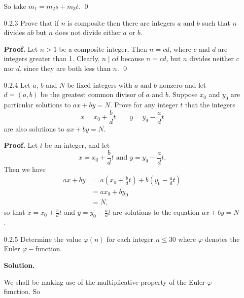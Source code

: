 \begin{enumerate}
      So take $m_1 = m_2s + m_3t$. \qed
   \item[0.2.3]   Prove that if $n$ is composite then there are integers $a$ and
                  $b$ such that $n$ divides $ab$ but $n$ does not divide either
                  $a$ or $b$.

      \textbf{Proof.} Let $n > 1$ be a composite integer. Then $n = cd$, where
      $c$ and $d$ are integers greater than 1. Clearly, $n \mid cd$ because
      $n = cd$, but $n$ divides neither $c$ nor $d$, since they are both less
      than $n$. \qed
   \item[0.2.4]   Let $a$, $b$ and $N$ be fixed integers with $a$ and $b$ 
                  nonzero and let $d = (a, b)$ be the greatest common divisor of
                  $a$ and $b$. Suppose $x_0$ and $y_0$ are particular solutions
                  to $ax + by = N$. Prove for any integer $t$ that the integers
                  $$x = x_0 + \frac{b}{d}t \qquad y = y_0 - \frac{a}{d}t$$
                  are also solutions to $ax + by = N$.

      \textbf{Proof.} Let $t$ be an integer, and let
		$$x = x_0 + \frac{b}{d}t \text{ and } y = y_0 - \frac{a}{d}t.$$
		Then we have
		\begin{align*}
			ax + by &= a\left(x_0 + \frac{b}{d}t\right) +
						  b\left(y_0 - \frac{a}{d}t\right) \\
					  &= ax_0 + by_0 \\
					  &= N,					  
		\end{align*}
		so that $x = x_0 + \frac{b}{d}t$ and $y = y_0 - \frac{a}{d}t$ are
		solutions to the equation $ax + by = N$.
   \item[0.2.5]   Determine the value $\varphi(n)$ for each integer $n \le 30$
                  where $\varphi$ denotes the Euler $\varphi-$function.  

      \textbf{Solution.}

      We shall be making use of the multiplicative property of the Euler
		$\varphi-$function. So 


\end{enumerate}
